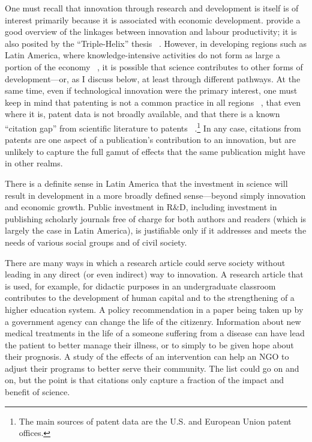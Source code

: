 One must recall that innovation through research and development is itself is of interest primarily because it is associated with economic development.  \citet{Powell2004} provide a good overview of the linkages between innovation and labour productivity; it is also posited by the ``Triple-Helix'' thesis ~\citep{Leydesdorff2005}. However, in developing regions such as Latin America, where knowledge-intensive activities do not form as large a portion of the economy ~\citep{OECD2012}, it is possible that science contributes to other forms of development—or, as I discuss below, at least through different pathways. At the same time, even if technological innovation were the primary interest, one must keep in mind that patenting is not a common practice in all regions ~\citep{Tvedt2010}, that even where it is, patent data is not broadly available, and that there is a known ``citation gap'' from scientific literature to patents ~\citep[p. 18]{Moed2006}.\footnote{The main sources of patent data are the U.S. and European Union patent offices.} In any case, citations from patents are one aspect of a publication's contribution to an innovation, but are unlikely to capture the full gamut of effects that the same publication might have in other realms.

There is a definite sense in Latin America that the investment in science will result in development in a more broadly defined sense—beyond simply innovation and economic growth. Public investment in R\&D, including investment in publishing scholarly journals free of charge for both authors and readers (which is largely the case in Latin America), is justifiable only if it addresses and meets the needs of various social groups and of civil society.

There are many ways in which a research article could serve society without leading in any direct (or even indirect) way to innovation. A research article that is used, for example, for didactic purposes in an undergraduate classroom contributes to the development of human capital and to the strengthening of a higher education system. A policy recommendation in a paper being taken up by a government agency can change the life of the citizenry. Information about new medical treatments in the life of a someone suffering from a disease can have lead the patient to better manage their illness, or to simply to be given hope about their prognosis. A study of the effects of an intervention can help an NGO to adjust their programs to better serve their community. The list could go on and on, but the point is that citations only capture a fraction of the impact and benefit of science.

